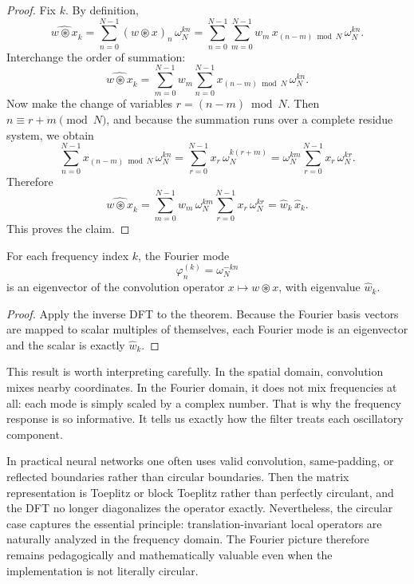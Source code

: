 \begin{proof}
Fix $k$.
By definition,
\[
\widehat{w \circledast x}_k
= \sum_{n=0}^{N-1} (w \circledast x)_n\, \omega_N^{kn}
= \sum_{n=0}^{N-1}\sum_{m=0}^{N-1} w_m\, x_{(n-m)\bmod N}\, \omega_N^{kn}.
\]
Interchange the order of summation:
\[
\widehat{w \circledast x}_k
= \sum_{m=0}^{N-1} w_m \sum_{n=0}^{N-1} x_{(n-m)\bmod N}\, \omega_N^{kn}.
\]
Now make the change of variables $r=(n-m) \bmod N$.
Then $n \equiv r+m \pmod N$, and because the summation runs over a complete residue system, we obtain
\[
\sum_{n=0}^{N-1} x_{(n-m)\bmod N}\, \omega_N^{kn}
= \sum_{r=0}^{N-1} x_r\, \omega_N^{k(r+m)}
= \omega_N^{km} \sum_{r=0}^{N-1} x_r\, \omega_N^{kr}.
\]
Therefore
\[
\widehat{w \circledast x}_k
= \sum_{m=0}^{N-1} w_m\, \omega_N^{km}
   \sum_{r=0}^{N-1} x_r\, \omega_N^{kr}
= \widehat{w}_k\, \widehat{x}_k.
\]
This proves the claim.
\end{proof}

\begin{corollary}
For each frequency index $k$, the Fourier mode
\[
\varphi^{(k)}_n = \omega_N^{-kn}
\]
is an eigenvector of the convolution operator $x \mapsto w \circledast x$, with eigenvalue $\widehat{w}_k$.
\end{corollary}

\begin{proof}
Apply the inverse DFT to the theorem.
Because the Fourier basis vectors are mapped to scalar multiples of themselves, each Fourier mode is an eigenvector and the scalar is exactly $\widehat{w}_k$.
\end{proof}

\medskip

This result is worth interpreting carefully.
In the spatial domain, convolution mixes nearby coordinates.
In the Fourier domain, it does not mix frequencies at all:
each mode is simply scaled by a complex number.
That is why the frequency response is so informative.
It tells us exactly how the filter treats each oscillatory component.

\begin{remark}
In practical neural networks one often uses valid convolution, same-padding, or reflected boundaries rather than circular boundaries.
Then the matrix representation is Toeplitz or block Toeplitz rather than perfectly circulant, and the DFT no longer diagonalizes the operator exactly.
Nevertheless, the circular case captures the essential principle:
translation-invariant local operators are naturally analyzed in the frequency domain.
The Fourier picture therefore remains pedagogically and mathematically valuable even when the implementation is not literally circular.
\end{remark}


